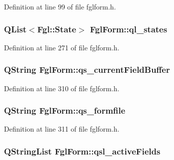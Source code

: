 Definition at line 99 of file fglform.h.

\hypertarget{classFglForm_a18774054d5c9773a7075b5933b0bbc9a}{
\subsubsection[{ql\_\-states}]{\setlength{\rightskip}{0pt plus 5cm}QList$<${\bf Fgl::State}$>$ {\bf FglForm::ql\_\-states}}}
\label{classFglForm_a18774054d5c9773a7075b5933b0bbc9a}


Definition at line 271 of file fglform.h.

\hypertarget{classFglForm_a04725912842355fc88fa7412e435f4a9}{
\subsubsection[{qs\_\-currentFieldBuffer}]{\setlength{\rightskip}{0pt plus 5cm}QString {\bf FglForm::qs\_\-currentFieldBuffer}}}
\label{classFglForm_a04725912842355fc88fa7412e435f4a9}


Definition at line 310 of file fglform.h.

\hypertarget{classFglForm_a1bca5dcb62f50a5939c295b7c0d662d2}{
\subsubsection[{qs\_\-formfile}]{\setlength{\rightskip}{0pt plus 5cm}QString {\bf FglForm::qs\_\-formfile}}}
\label{classFglForm_a1bca5dcb62f50a5939c295b7c0d662d2}


Definition at line 311 of file fglform.h.

\hypertarget{classFglForm_a127a846458930510880fd13eb07d4463}{
\subsubsection[{qsl\_\-activeFields}]{\setlength{\rightskip}{0pt plus 5cm}QStringList {\bf FglForm::qsl\_\-activeFields}}}
\label{classFglForm_a127a846458930510880fd13eb07d4463}


